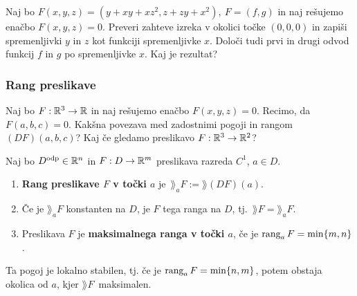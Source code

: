 \begin{zgled}
    Naj bo $F(x,y,z) = (y + xy+xz^2, z+zy+x^2), \ F = (f, g)$ in naj rešujemo enačbo $F(x,y,z) = 0$. Preveri zahteve izreka v okolici točke $(0,0,0)$ in zapiši spremenljivki $y$ in $z$ kot funkciji spremenljivke $x$. Določi tudi prvi in drugi odvod funkcij $f$ in $g$ po spremenljivke $x$. Kaj je rezultat?
\end{zgled}

\subsubsection{Rang preslikave}
\begin{zgled}
    Naj bo $F: \mathbb{R}^3 \to \mathbb{R}$ in naj rešujemo enačbo $F(x,y,z) = 0$. Recimo, da $F(a,b,c) = 0$. Kakšna povezava med zadostnimi pogoji in rangom $(DF)(a,b,c)$? Kaj če gledamo preslikavo $F: \mathbb{R}^3 \to \mathbb{R}^2$?
\end{zgled}

\begin{definicija}
    Naj bo $D^\text{odp} \in \mathbb{R}^n$ in $F: D \to \mathbb{R}^m$ preslikava razreda $C^1$, $a \in D$. 
    \begin{enumerate}
        \item \textbf{Rang preslikave $F$ v točki $a$} je~$\rang_aF := \rang (DF)(a)$.
        \item Če je $\rang_aF$ konstanten na $D$, je $F$ tega ranga na $D$, tj.\ $\rang F = \rang_aF$.
        \item Preslikava $F$ je \textbf{maksimalnega ranga v točki $a$}, če je $\operatorname{rang}_aF = \min \{m, n\}$.
    \end{enumerate}      
\end{definicija}

\begin{opomba}
    Ta pogoj je lokalno stabilen, tj. če je $\operatorname{rang}_aF = \min \{n, m\}$, potem obstaja okolica od $a$, kjer $\rang F$~maksimalen.
\end{opomba}


